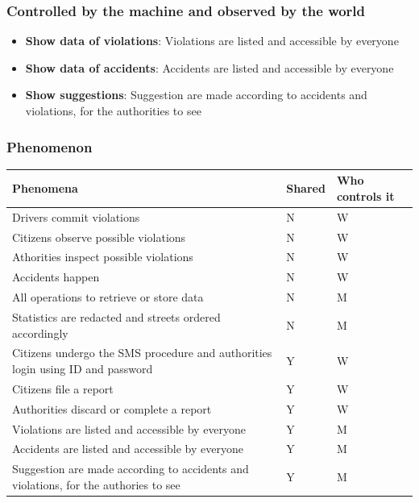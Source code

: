 \subsubsection*{Controlled by the machine and observed by the world}

\begin{itemize}

\item \textbf{Show data of violations}: Violations are listed and accessible by everyone

\item \textbf{Show data of accidents}: Accidents are listed and accessible by everyone

\item \textbf{Show suggestions}: Suggestion are made according to accidents and violations, for the authorities to see

\end{itemize}

\subsubsection{Phenomenon}
\begin{tabular}{|l|l|l|}
\hline
\textbf{Phenomena} & \textbf{Shared} & \textbf{Who controls it} \\ \hline
Drivers commit violations & N & W\\ \hline
Citizens observe possible violations & N & W\\ \hline
Athorities inspect possible violations & N & W\\ \hline
Accidents happen & N & W\\ \hline
All operations to retrieve or store data & N & M\\ \hline
Statistics are redacted and streets ordered accordingly & N & M\\ \hline
Citizens undergo the SMS procedure and authorities login using ID and password & Y & W\\ \hline
Citizens file a report & Y & W\\ \hline
Authorities discard or complete a report & Y & W\\ \hline
Violations are listed and accessible by everyone& Y & M\\ \hline
Accidents are listed and accessible by everyone& Y & M\\ \hline
Suggestion are made according to accidents and violations, for the authories to see & Y & M\\
\hline 
\end{tabular}

